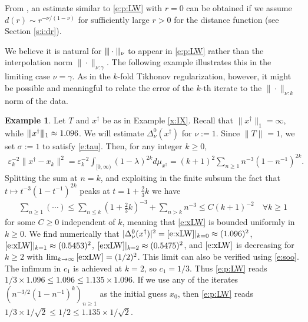 \documentclass[10pt, a4paper]{iopart}
\newcommand{\norm}[2]{     \| #1       \|_{ #2 }}
\newcommand{\normiii}[2]{\vert\kern-0.25ex\vert\kern-0.25ex\vert #1 \vert\kern-0.25ex \vert\kern-0.25ex\vert_{ #2 }}
\theoremstyle{remark}
\theoremstyle{definition}
\newtheorem{example}[lemma]{Example}
\begin{document}
From \cite[Theorem 1 and Corollary 1]{FlemmingHofmannMathe2011},
an estimate similar to \eqref{e:p:LW} with $r = 0$
can be obtained
if we assume
$d(r) \sim r^{-\nu/(1 - \nu)}$ for sufficiently large $r > 0$
for the distance function
(see Section \ref{s:i:dr}).

%

We believe it is natural for $\normiii{\cdot}{\nu}$
to appear in \eqref{e:p:LW}
rather than the interpolation norm $\norm{\cdot}{\nu : \gamma}$.
%
The following example illustrates this in 
the limiting case $\nu = \gamma$.
%
As in the $k$-fold Tikhonov regularization,
however,
it might be possible and meaningful
to relate the error of the $k$-th iterate 
to the $\norm{\cdot}{\nu : k}$ norm of the data.

\begin{example}
\label{x:IX:LW}
	Let $T$ and $x^\dag$ be as in Example \ref{x:IX}.
	Recall that $\norm{x^\dag}{1} = \infty$,
	while $\normiii{x^\dag}{1} \approx 1.096$.
	We will estimate
	$\Delta_{\nu}^{0}(x^\dag)$ for $\nu := 1$.
	Since $\norm{T}{} = 1$, we set $\sigma := 1$ to satisfy \eqref{e:tau}.
	Then, for any integer $k \geq 0$,
	\begin{align}
	\label{e:xLW}
		\varepsilon_k^{-2}
		\norm{ x^\dag - x_k }{}^2
		=
		\varepsilon_k^{-2}
		\int_{[0, \infty)}
		(1 - \lambda)^{2 k}
		d \mu_{x^\dag}
		=
		(k + 1)^2
		\sum_{n \geq 1}
		n^{-3}
		(1 - n^{-1})^{2 k}
		.
	\end{align}
	Splitting the sum at $n = k$,
	and exploiting 
	in the finite subsum
	the fact that $t \mapsto t^{-3} (1 - t^{-1})^{2k}$
	peaks at $t = 1 + \tfrac23 k$
	we have
	\begin{align}
		\sum_{n \geq 1} (\cdots)
		\leq
		\sum_{n \leq k} (1 + \tfrac23 k)^{-3}
		+
		\sum_{n > k} n^{-3}
		\leq
		C
		(k + 1)^{-2}
		\quad
		\forall k \geq 1
	\end{align}
	for some $C \geq 0$ independent of $k$,
	meaning that \eqref{e:xLW}
	is bounded uniformly in $k \geq 0$.
	We find numerically that 
	$|\Delta_{\nu}^{0}(x^\dag)|^2 = \eqref{e:xLW}|_{k = 0} \approx (1.096)^2$,
	$\eqref{e:xLW}|_{k = 1} \approx (0.5453)^2$,
	$\eqref{e:xLW}|_{k = 2} \approx (0.5475)^2$,
	and
	$\eqref{e:xLW}$
	is decreasing for $k \geq 2$
	with 
	$\lim_{k \to \infty} \eqref{e:xLW} = (1/2)^2$.
	This limit can also be verified using \eqref{e:soo}.
	The infimum in $c_1$ is achieved at $k = 2$,
	so $c_1 = 1/3$.
	Thus \eqref{e:p:LW} reads 
	$1/3 \times 1.096 \leq 1.096 \leq 1.135 \times 1.096$.
	If we use any of the iterates $(n^{-3/2} (1 - n^{-1})^{k})_{n \geq 1}$ as 
	the initial guess $x_0$,
	then \eqref{e:p:LW} reads
	$1/3 \times 1/\sqrt{2} \leq 1/2 \leq 1.135 \times 1/\sqrt{2}$.
\end{example}
\end{document}
